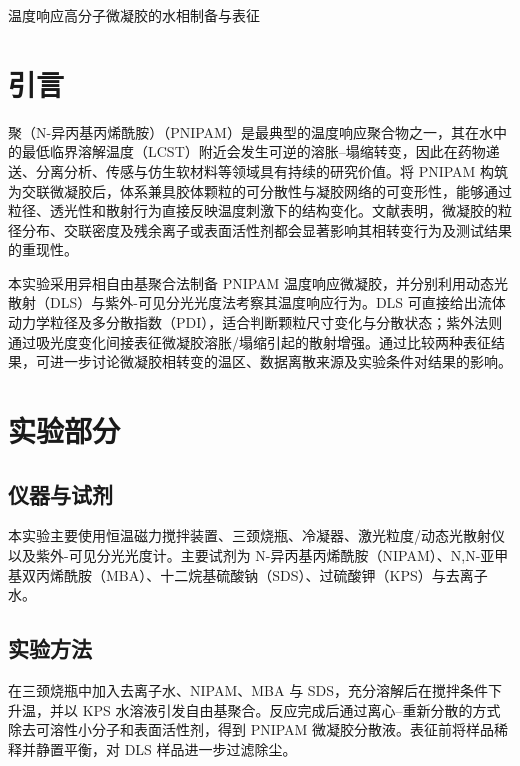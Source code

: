 \documentclass[a4paper]{article}
\newcommand{\zihaoSan}{\fontsize{16pt}{24pt}\selectfont}
\newcommand{\zihaoWu}{\fontsize{10.5pt}{16pt}\selectfont}
\begin{document}
\zihaoWu

\begin{center}
	{\zihaoSan\heiti 温度响应高分子微凝胶的水相制备与表征}
\end{center}

\section{引言}
\vspace{-0.5em}

聚（N-异丙基丙烯酰胺）（PNIPAM）是最典型的温度响应聚合物之一，其在水中的最低临界溶解温度（LCST）附近会发生可逆的溶胀--塌缩转变，因此在药物递送、分离分析、传感与仿生软材料等领域具有持续的研究价值。将 PNIPAM 构筑为交联微凝胶后，体系兼具胶体颗粒的可分散性与凝胶网络的可变形性，能够通过粒径、透光性和散射行为直接反映温度刺激下的结构变化。文献表明，微凝胶的粒径分布、交联密度及残余离子或表面活性剂都会显著影响其相转变行为及测试结果的重现性。

本实验采用异相自由基聚合法制备 PNIPAM 温度响应微凝胶，并分别利用动态光散射（DLS）与紫外-可见分光光度法考察其温度响应行为。DLS 可直接给出流体动力学粒径及多分散指数（PDI），适合判断颗粒尺寸变化与分散状态；紫外法则通过吸光度变化间接表征微凝胶溶胀/塌缩引起的散射增强。通过比较两种表征结果，可进一步讨论微凝胶相转变的温区、数据离散来源及实验条件对结果的影响。

\section{实验部分}
\vspace{-0.5em}

\subsection{仪器与试剂}

本实验主要使用恒温磁力搅拌装置、三颈烧瓶、冷凝器、激光粒度/动态光散射仪以及紫外-可见分光光度计。主要试剂为 N-异丙基丙烯酰胺（NIPAM）、N,N-亚甲基双丙烯酰胺（MBA）、十二烷基硫酸钠（SDS）、过硫酸钾（KPS）与去离子水。

\subsection{实验方法}

在三颈烧瓶中加入去离子水、NIPAM、MBA 与 SDS，充分溶解后在搅拌条件下升温，并以 KPS 水溶液引发自由基聚合。反应完成后通过离心--重新分散的方式除去可溶性小分子和表面活性剂，得到 PNIPAM 微凝胶分散液。表征前将样品稀释并静置平衡，对 DLS 样品进一步过滤除尘。
\end{document}
